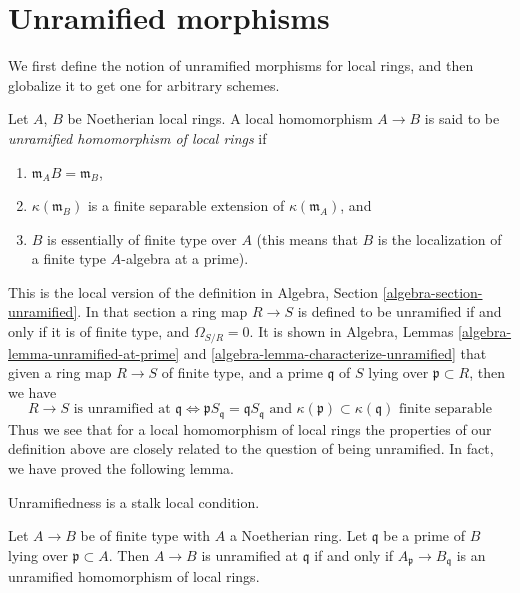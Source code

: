 \section{Unramified morphisms}
\label{section-unramified-definition}

\noindent
We first define the notion of unramified morphisms for local rings, and then
globalize it to get one for arbitrary schemes.

\begin{definition}
\label{definition-unramified-rings}
Let $A$, $B$ be Noetherian local rings. A local homomorphism $A \to B$
is said to be {\it unramified homomorphism of local rings} if
\begin{enumerate}
\item $\mathfrak m_AB = \mathfrak m_B$,
\item $\kappa(\mathfrak m_B)$ is a finite separable extension of
$\kappa(\mathfrak m_A)$, and
\item $B$ is essentially of finite type over $A$ (this means
that $B$ is the localization of a finite type $A$-algebra at a prime).
\end{enumerate}
\end{definition}

\noindent
This is the local version of the
definition in Algebra, Section \ref{algebra-section-unramified}.
In that section a ring map $R \to S$ is defined to be unramified if and
only if it is of finite type, and $\Omega_{S/R} = 0$.
It is shown in
Algebra, Lemmas \ref{algebra-lemma-unramified-at-prime} and
\ref{algebra-lemma-characterize-unramified} that given a ring
map $R \to S$ of finite type, and a prime $\mathfrak q$ of $S$
lying over $\mathfrak p \subset R$, then we have
$$
R \to S\text{ is unramified at }\mathfrak q
\Leftrightarrow
\mathfrak pS_{\mathfrak q} = \mathfrak q S_{\mathfrak q}
\text{ and }
\kappa(\mathfrak p) \subset \kappa(\mathfrak q)\text{ finite separable}
$$
Thus we see that for a local homomorphism of local rings the properties
of our definition above are closely related to the question of
being unramified. In fact, we have proved the following lemma.

\begin{lemma}
\label{lemma-characterize-unramified-Noetherian}
\begin{slogan}
Unramifiedness is a stalk local condition.
\end{slogan}
Let $A \to B$ be of finite type with $A$ a Noetherian ring.
Let $\mathfrak q$ be a prime of $B$ lying over $\mathfrak p \subset A$.
Then $A \to B$ is unramified at $\mathfrak q$ if and only if
$A_{\mathfrak p} \to B_{\mathfrak q}$ is an unramified homomorphism
of local rings.
\end{lemma}

